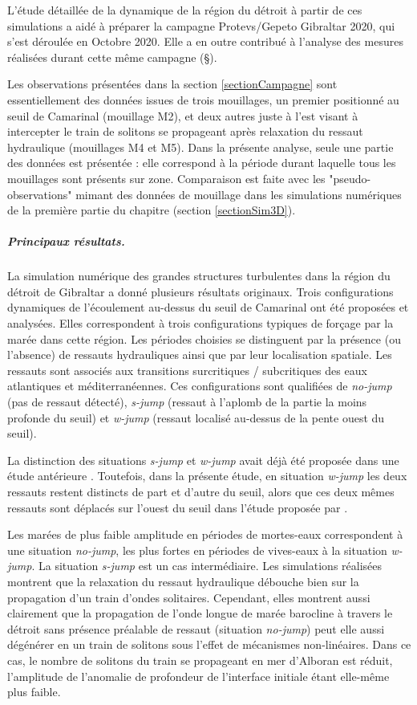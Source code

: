 L'étude détaillée de la dynamique de la région du détroit à partir de ces simulations a aidé à préparer la campagne Protevs/Gepeto Gibraltar 2020, qui s'est déroulée en Octobre 2020. Elle a en outre contribué à l'analyse des mesures réalisées durant cette même campagne (\S {}).

Les observations présentées dans la section \ref{sectionCampagne} sont essentiellement des données issues de trois mouillages, un premier positionné au seuil de Camarinal (mouillage M2), et deux autres juste à l'est visant à intercepter le train de solitons se propageant après relaxation du ressaut hydraulique (mouillages M4 et M5). Dans la présente analyse, seule une partie des données est présentée : elle correspond à la période durant laquelle tous les mouillages sont présents sur zone. Comparaison est faite avec les "pseudo-observations" mimant des données de mouillage dans les simulations numériques de la première partie du chapitre (section \ref{sectionSim3D}).

\subparagraph{Principaux résultats.}
La simulation numérique des grandes structures turbulentes dans la région du détroit de Gibraltar a donné plusieurs résultats originaux. Trois configurations dynamiques de l'écoulement au-dessus du seuil de Camarinal ont été proposées et analysées. Elles correspondent à trois configurations typiques de forçage par la marée dans cette région. Les périodes choisies se distinguent par la présence (ou l'absence) de ressauts hydrauliques ainsi que par leur localisation spatiale. Les ressauts sont associés aux transitions surcritiques / subcritiques des eaux atlantiques et méditerranéennes. Ces configurations sont qualifiées de \textit{no-jump} (pas de ressaut détecté), \textit{s-jump} (ressaut à l'aplomb de la partie la moins profonde du seuil) et \textit{w-jump} (ressaut localisé au-dessus de la pente ouest du seuil).

La distinction des situations \textit{s-jump} et \textit{w-jump} avait déjà été proposée dans une étude antérieure \citep{sanchez-garrido_2011}. Toutefois, dans la présente étude, en situation \textit{w-jump} les deux ressauts restent distincts de part et d'autre du seuil, alors que ces deux mêmes ressauts sont déplacés sur l'ouest du seuil dans l'étude proposée par \citet{sanchez-garrido_2011}.

Les marées de plus faible amplitude en périodes de mortes-eaux correspondent à une situation \textit{no-jump}, les plus fortes en périodes de vives-eaux à la situation \textit{w-jump}. La situation \textit{s-jump} est un cas intermédiaire. Les simulations réalisées montrent que la relaxation du ressaut hydraulique débouche bien sur la propagation d'un train d'ondes solitaires. Cependant, elles montrent aussi clairement que la propagation de l'onde longue de marée barocline à travers le détroit sans présence préalable de ressaut (situation  \textit{no-jump}) peut elle aussi dégénérer en un train de solitons sous l'effet de mécanismes non-linéaires. Dans ce cas, le nombre de solitons du train se propageant en mer d'Alboran est réduit, l'amplitude de l'anomalie de profondeur de l'interface initiale étant elle-même plus faible.

